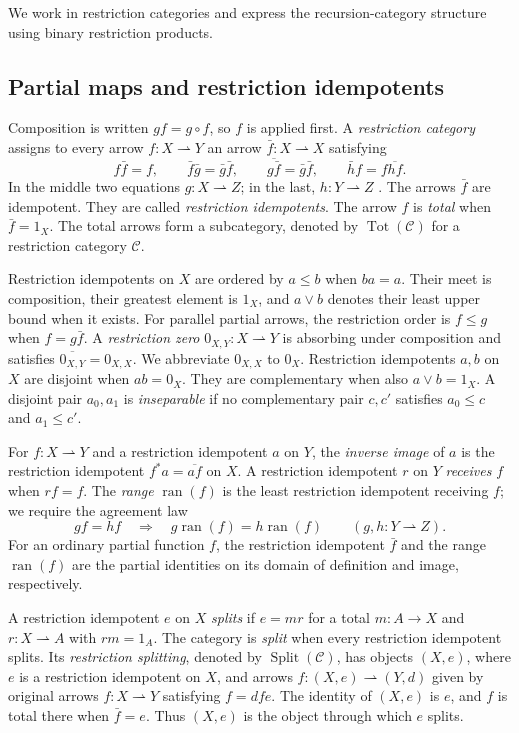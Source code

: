 \documentclass[11pt]{article}
\newcommand{\ran}{\operatorname{ran}}
\begin{document}
We work in restriction categories \cite{CockettLack} and express the
recursion-category structure using binary restriction products.

\subsection{Partial maps and restriction idempotents}

Composition is written $gf=g\circ f$, so $f$ is applied first.
A \emph{restriction category} assigns to every arrow
$f:X\rightharpoonup Y$ an arrow
$\bar f:X\rightharpoonup X$ satisfying
\[
 f\bar f=f,\qquad
 \bar f\bar g=\bar g\bar f,\qquad
 \overline{g\bar f}=\bar g\bar f,\qquad
 \bar h f=f\overline{hf}.
\]
In the middle two equations $g:X\rightharpoonup Z$; in the last,
$h:Y\rightharpoonup Z$ \cite{CockettLack}.
The arrows $\bar f$ are idempotent. They are called
\emph{restriction idempotents}.
The arrow $f$ is \emph{total} when $\bar f=1_X$.
The total arrows form a subcategory, denoted by
$\operatorname{Tot}(\mathcal C)$ for a restriction category $\mathcal C$.

Restriction idempotents on $X$ are ordered by $a\le b$ when $ba=a$.
Their meet is composition, their greatest element is $1_X$, and
$a\vee b$ denotes their least upper bound when it exists.
For parallel partial arrows, the restriction order is
$f\le g$ when $f=g\bar f$.
A \emph{restriction zero} $0_{X,Y}:X\rightharpoonup Y$ is
absorbing under composition and satisfies
$\overline{0_{X,Y}}=0_{X,X}$. We abbreviate $0_{X,X}$ to $0_X$.
Restriction idempotents $a,b$ on $X$ are disjoint when $ab=0_X$.
They are complementary when also $a\vee b=1_X$.
A disjoint pair $a_0,a_1$ is \emph{inseparable} if no complementary
pair $c,c'$ satisfies $a_0\le c$ and $a_1\le c'$.

For $f:X\rightharpoonup Y$ and a restriction idempotent $a$ on $Y$,
the \emph{inverse image} of $a$ is the restriction idempotent
$f^*a=\overline{af}$ on $X$.
A restriction idempotent $r$ on $Y$ \emph{receives} $f$ when $rf=f$.
The \emph{range} $\ran(f)$ is the least restriction idempotent receiving $f$;
we require the agreement law
\[
 gf=hf\quad\Longrightarrow\quad
 g\ran(f)=h\ran(f)
 \qquad(g,h:Y\rightharpoonup Z).
\]
For an ordinary partial function $f$, the restriction idempotent
$\bar f$ and the range $\ran(f)$ are the partial identities on its
domain of definition and image, respectively.

A restriction idempotent $e$ on $X$ \emph{splits} if
$e=mr$ for a total $m:A\to X$ and $r:X\rightharpoonup A$
with $rm=1_A$. The category is \emph{split} when every restriction
idempotent splits.
Its \emph{restriction splitting}, denoted by
$\operatorname{Split}(\mathcal C)$, has objects $(X,e)$, where $e$ is a
restriction idempotent on $X$, and arrows
$f:(X,e)\rightharpoonup(Y,d)$ given by original arrows
$f:X\rightharpoonup Y$ satisfying $f=dfe$.
The identity of $(X,e)$ is $e$, and $f$ is total there when
$\bar f=e$. Thus $(X,e)$ is the object through which $e$ splits.
\end{document}

